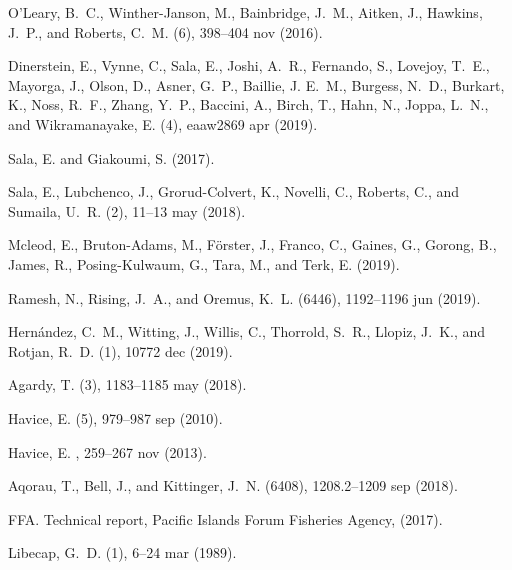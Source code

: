 \documentclass[12pt]{article}
\begin{document}
\begin{thebibliography}{10}

O'Leary, B.~C., Winther-Janson, M., Bainbridge, J.~M., Aitken, J., Hawkins,
  J.~P., and Roberts, C.~M.
(6), 398--404 nov  (2016).

Dinerstein, E., Vynne, C., Sala, E., Joshi, A.~R., Fernando, S., Lovejoy,
  T.~E., Mayorga, J., Olson, D., Asner, G.~P., Baillie, J. E.~M., Burgess,
  N.~D., Burkart, K., Noss, R.~F., Zhang, Y.~P., Baccini, A., Birch, T., Hahn,
  N., Joppa, L.~N., and Wikramanayake, E.
(4), eaaw2869 apr  (2019).

Sala, E. and Giakoumi, S.
 (2017).

Sala, E., Lubchenco, J., Grorud-Colvert, K., Novelli, C., Roberts, C., and
  Sumaila, U.~R.
(2), 11--13 may  (2018).

Mcleod, E., Bruton-Adams, M., Förster, J., Franco, C., Gaines, G., Gorong, B.,
  James, R., Posing-Kulwaum, G., Tara, M., and Terk, E.
 (2019).

Ramesh, N., Rising, J.~A., and Oremus, K.~L.
(6446), 1192--1196 jun  (2019).

Hernández, C.~M., Witting, J., Willis, C., Thorrold, S.~R., Llopiz, J.~K., and
  Rotjan, R.~D.
(1), 10772 dec  (2019).

Agardy, T.
(3), 1183--1185 may
  (2018).

Havice, E.
(5), 979--987 sep  (2010).

Havice, E.
, 259--267 nov  (2013).

Aqorau, T., Bell, J., and Kittinger, J.~N.
(6408), 1208.2--1209 sep  (2018).

FFA.
\newblock Technical report, Pacific Islands Forum Fisheries Agency,  (2017).

Libecap, G.~D.
(1), 6--24 mar  (1989).


\end{thebibliography}
\end{document}
